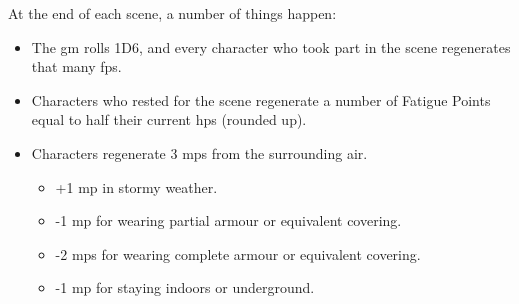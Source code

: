 
At the end of each scene, a number of things happen:

\begin{itemize}
  \item
  The \gls{gm} rolls 1D6, and every character who took part in the scene regenerates that many \glspl{fp}.
  \item
  Characters who rested for the scene regenerate a number of Fatigue Points equal to half their current \glspl{hp} (rounded up).
  \item
  Characters regenerate 3 \glspl{mp} from the surrounding air.
  \begin{itemize}
    \item
    +1 \gls{mp} in stormy weather.
    \item
    -1 \gls{mp} for wearing partial armour or equivalent covering.
    \item
    -2 \glspl{mp} for wearing complete armour or equivalent covering.
    \item
    -1 \gls{mp} for staying indoors or underground.
  \end{itemize}
\end{itemize}
